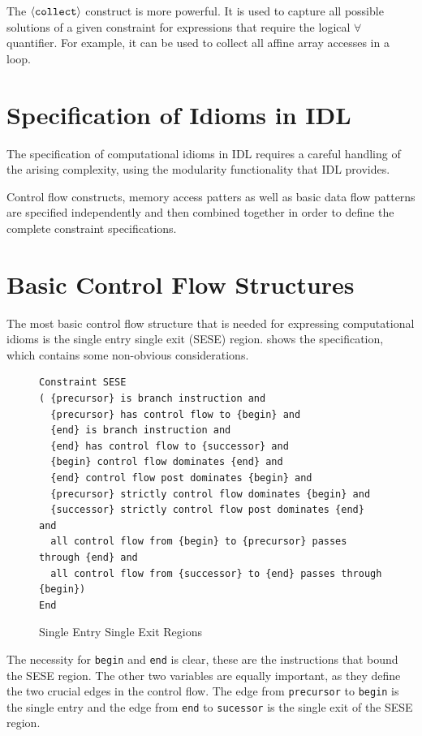     The $\left<\text{\tt collect}\right>$ construct is more powerful.
    It is used to capture all possible solutions of a given constraint for
    expressions that require the logical $\forall$ quantifier.
    For example, it can be used to collect all affine array accesses in a loop.

\section{Specification of Idioms in IDL}
\label{sec:idioms}

    The specification of computational idioms in IDL requires a careful
    handling of the arising complexity, using the modularity functionality that
    IDL provides.

    Control flow constructs, memory access patters as well as basic data flow
    patterns are specified independently and then combined together in order to
    define the complete constraint specifications.


\section{Basic Control Flow Structures}

    The most basic control flow structure that is needed for expressing
    computational idioms is the single entry single exit (SESE) region.
     shows the specification, which contains some
    non-obvious considerations.

\begin{figure}[h]
\begin{lstlisting}[language=CAnDL]
Constraint SESE
( {precursor} is branch instruction and
  {precursor} has control flow to {begin} and
  {end} is branch instruction and
  {end} has control flow to {successor} and
  {begin} control flow dominates {end} and
  {end} control flow post dominates {begin} and
  {precursor} strictly control flow dominates {begin} and
  {successor} strictly control flow post dominates {end} and
  all control flow from {begin} to {precursor} passes through {end} and
  all control flow from {successor} to {end} passes through {begin})
End
\end{lstlisting}
\caption{Single Entry Single Exit Regions}
\label{candl_sese}
\end{figure}

    The necessity for {\tt begin} and {\tt end} is clear, these are the
    instructions that bound the SESE region.
    The other two variables are equally important, as they define the two
    crucial edges in the control flow.
    The edge from {\tt precursor} to {\tt begin} is the
    single entry and the edge from {\tt end} to {\tt sucessor} is the single
    exit of the SESE region.

